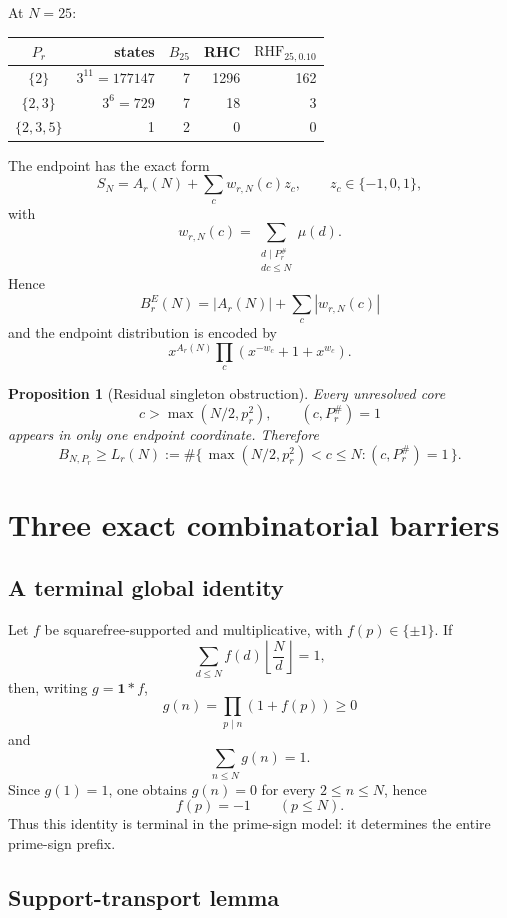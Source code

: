 \documentclass[11pt]{article}
\newtheorem{proposition}[theorem]{Proposition}
\newcommand{\RHF}{\mathrm{RHF}}
\begin{document}
At $N=25$:
\begin{center}
\begin{tabular}{c r r r r}
\toprule
$P_r$ & states & $B_{25}$ & RHC & $\RHF_{25,0.10}$\\
\midrule
$\{2\}$&$3^{11}=177147$&7&1296&162\\
$\{2,3\}$&$3^6=729$&7&18&3\\
$\{2,3,5\}$&1&2&0&0\\
\bottomrule
\end{tabular}
\end{center}

The endpoint has the exact form
\[
 S_N=A_r(N)+\sum_c w_{r,N}(c)z_c,
\qquad z_c\in\{-1,0,1\},
\]
with
\[
 \boxed{
 w_{r,N}(c)=
 \sum_{\substack{d\mid P_r^\#\\dc\le N}}\mu(d).
 }
\]
Hence
\[
 \boxed{
 B_r^E(N)=|A_r(N)|+\sum_c|w_{r,N}(c)|
 }
\]
and the endpoint distribution is encoded by
\[
 x^{A_r(N)}\prod_c(x^{-w_c}+1+x^{w_c}).
\]

\begin{proposition}[Residual singleton obstruction]
Every unresolved core
\[
 c>\max(N/2,p_r^2),\qquad(c,P_r^\#)=1
\]
appears in only one endpoint coordinate.  Therefore
\[
 \boxed{
 B_{N,P_r}\ge
 L_r(N):=
 \#\{\,\max(N/2,p_r^2)<c\le N:(c,P_r^\#)=1\,\}.
 }
\]
\end{proposition}

\section{Three exact combinatorial barriers}

\subsection{A terminal global identity}

Let $f$ be squarefree-supported and multiplicative, with $f(p)\in\{\pm1\}$.  If
\[
 \sum_{d\le N}f(d)\left\lfloor\frac Nd\right\rfloor=1,
\]
then, writing $g=\mathbf1*f$,
\[
 g(n)=\prod_{p\mid n}(1+f(p))\ge0
\]
and
\[
 \sum_{n\le N}g(n)=1.
\]
Since $g(1)=1$, one obtains $g(n)=0$ for every $2\le n\le N$, hence
\[
 f(p)=-1\qquad(p\le N).
\]
Thus this identity is terminal in the prime-sign model: it determines the entire prime-sign prefix.

\subsection{Support-transport lemma}
\end{document}
